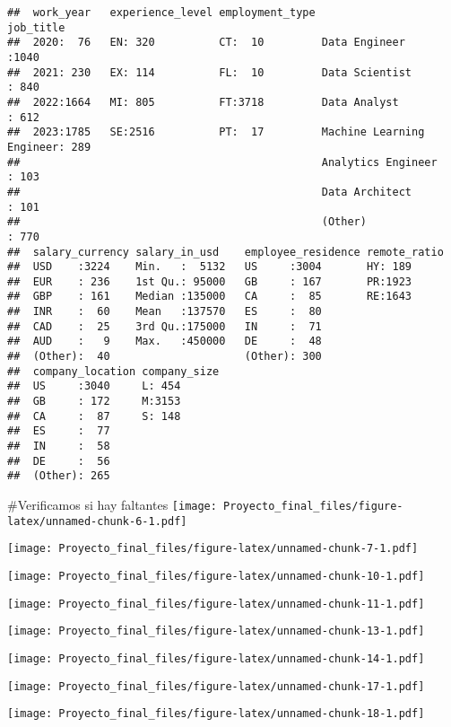 \documentclass[
]{article}
\begin{document}
\begin{verbatim}
##  work_year   experience_level employment_type                     job_title   
##  2020:  76   EN: 320          CT:  10         Data Engineer            :1040  
##  2021: 230   EX: 114          FL:  10         Data Scientist           : 840  
##  2022:1664   MI: 805          FT:3718         Data Analyst             : 612  
##  2023:1785   SE:2516          PT:  17         Machine Learning Engineer: 289  
##                                               Analytics Engineer       : 103  
##                                               Data Architect           : 101  
##                                               (Other)                  : 770  
##  salary_currency salary_in_usd    employee_residence remote_ratio
##  USD    :3224    Min.   :  5132   US     :3004       HY: 189     
##  EUR    : 236    1st Qu.: 95000   GB     : 167       PR:1923     
##  GBP    : 161    Median :135000   CA     :  85       RE:1643     
##  INR    :  60    Mean   :137570   ES     :  80                   
##  CAD    :  25    3rd Qu.:175000   IN     :  71                   
##  AUD    :   9    Max.   :450000   DE     :  48                   
##  (Other):  40                     (Other): 300                   
##  company_location company_size
##  US     :3040     L: 454      
##  GB     : 172     M:3153      
##  CA     :  87     S: 148      
##  ES     :  77                 
##  IN     :  58                 
##  DE     :  56                 
##  (Other): 265
\end{verbatim}

\#Verificamos si hay faltantes
\texttt{[image: Proyecto\_final\_files/figure-latex/unnamed-chunk-6-1.pdf]}

\texttt{[image: Proyecto\_final\_files/figure-latex/unnamed-chunk-7-1.pdf]}

\texttt{[image: Proyecto\_final\_files/figure-latex/unnamed-chunk-10-1.pdf]}

\texttt{[image: Proyecto\_final\_files/figure-latex/unnamed-chunk-11-1.pdf]}

\texttt{[image: Proyecto\_final\_files/figure-latex/unnamed-chunk-13-1.pdf]}

\texttt{[image: Proyecto\_final\_files/figure-latex/unnamed-chunk-14-1.pdf]}

\texttt{[image: Proyecto\_final\_files/figure-latex/unnamed-chunk-17-1.pdf]}

\texttt{[image: Proyecto\_final\_files/figure-latex/unnamed-chunk-18-1.pdf]}
\end{document}

